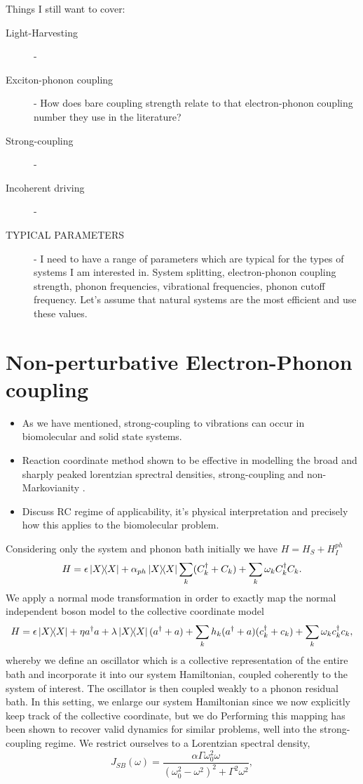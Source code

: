 \documentclass[]{article}
\begin{document}
Things I still want to cover:
\begin{description}
	\item[Light-Harvesting] - 
	\item[Exciton-phonon coupling] - How does bare coupling strength relate to that electron-phonon coupling number they use in the literature?
	\item[Strong-coupling] - 
	\item[Incoherent driving] - 
	\item[TYPICAL PARAMETERS] - I need to have a range of parameters which are typical for the types of systems I am interested in. System splitting, electron-phonon coupling strength, phonon frequencies, vibrational frequencies, phonon cutoff frequency. Let's assume that natural systems are the most efficient and use these values.
\end{description}
\section{Non-perturbative Electron-Phonon coupling}
\begin{itemize}
	\item As we have mentioned, strong-coupling to vibrations can occur in biomolecular and solid state systems.
	\item Reaction coordinate method shown to be effective in modelling the broad and sharply peaked lorentzian sprectral densities, strong-coupling and non-Markovianity \cite{keylist}.
	\item Discuss RC regime of applicability, it's physical interpretation and precisely how this applies to the biomolecular problem.
\end{itemize}

 Considering only the system and phonon bath initially we have $H = H_S + H_I^{ph}$
\begin{equation}
H = \epsilon \dyad{X} + \alpha_{ph}\dyad{X}\sum_{k}(C^{\dagger}_k+C_k) + \sum_{k}\omega_k C^{\dagger}_k C_k.
\end{equation}
We apply a normal mode transformation in order to exactly map the normal independent boson model to the collective coordinate model
\begin{equation}
H = \epsilon \dyad{X} + \eta a^{\dagger}a + \lambda\dyad{X}(a^{\dagger}+a) + \sum_{k}h_k(a^{\dagger}+a)(c^{\dagger}_k+c_k) + \sum_{k}\omega_k c^{\dagger}_k c_k,
\end{equation}
whereby we define an oscillator which  is a collective representation of the entire bath and incorporate it into our system Hamiltonian, coupled coherently to the system of interest. The oscillator is then coupled weakly to a phonon residual bath. In this setting, we enlarge our system Hamiltonian since we now explicitly keep track of the collective coordinate, but we do Performing this mapping has been shown to recover valid dynamics for similar problems, well into the strong-coupling regime.
We restrict ourselves to a Lorentzian spectral density, 
\begin{equation}
\label{eq:DrudeLorentzUnderdamped}
J_{SB}(\omega) = \frac{\alpha \Gamma \omega_0^2\omega}{(\omega_0^2-\omega^2)^2 + \Gamma^2\omega^2},
\end{equation}
\end{document}
